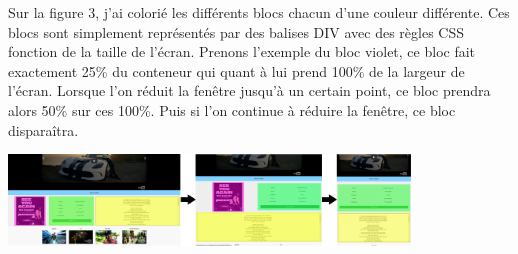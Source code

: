 \documentclass{article}
\begin{document}
Sur la figure 3, j'ai colori\'e les diff\'erents blocs chacun d'une couleur diff\'erente. Ces blocs sont simplement repr\'esent\'es par des balises DIV avec des r\`egles CSS fonction de la taille de l'\'ecran. Prenons l'exemple du bloc violet, ce bloc fait exactement 25\% du conteneur qui quant \`a lui prend 100\% de la largeur de l'\'ecran. Lorsque l'on r\'eduit la fen\^etre jusqu'\`a un certain point, ce bloc prendra alors 50\% sur ces 100\%. Puis si l'on continue \`a r\'eduire la fen\^etre, ce bloc dispara\^itra.\\  

\begin{center}
  \includegraphics[width=0.8\textwidth]{p8}
\end{center}
\end{document}
